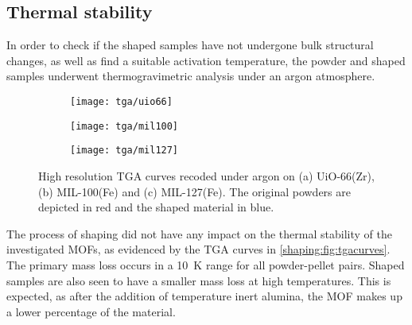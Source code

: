 
\subsection{Thermal stability}

In order to check if the shaped samples have not undergone bulk
structural changes, as well as find a suitable activation temperature,
the powder and shaped samples underwent thermogravimetric analysis
under an argon atmosphere.

\begin{figure}
	\centering
	\begin{subfigure}{0.85\textwidth}
		\parbox[c]{0.1\linewidth}{\caption{}\label{shaping:fig:tgauio66}}%
		\parbox[b]{0.7\linewidth}{%
			\texttt{[image: tga/uio66]}%
		}%
	\end{subfigure}%

	\begin{subfigure}{0.85\textwidth}
		\parbox[c]{0.1\linewidth}{\caption{}\label{shaping:fig:tgamil100}}%
		\parbox[b]{0.7\linewidth}{%
			\texttt{[image: tga/mil100]}%
		}%
	\end{subfigure}%
	
	\begin{subfigure}{0.85\textwidth}
		\parbox[c]{0.1\linewidth}{\caption{}\label{shaping:fig:tgamil127}}%
		\parbox[b]{0.7\linewidth}{%
			\texttt{[image: tga/mil127]}%
		}%
	\end{subfigure}%

	\caption{High resolution \gls{TGA} curves recoded under argon
		on (a) UiO-66(Zr), (b) MIL-100(Fe) and (c) MIL-127(Fe). The
		original powders are depicted in red and the shaped material
		in blue.}%
	\label{shaping:fig:tgacurves}

\end{figure}

The process of shaping did not have any impact on the thermal stability of
the investigated \glspl{MOF}, as evidenced by the \gls{TGA} curves in
\autoref{shaping:fig:tgacurves}. The primary mass loss occurs
in a \SI{10}{\kelvin} range for all powder-pellet pairs.
Shaped samples are also seen to have a smaller mass loss
at high temperatures. This is expected, as after the addition of
temperature inert alumina, the \gls{MOF} makes up a lower percentage of
the material.